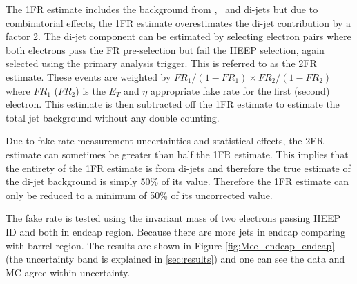 The 1FR estimate includes the background from \wjets, \phoJets\ and di-jets but due to combinatorial effects, the 1FR estimate overestimates the di-jet contribution by a factor 2. The di-jet component can be estimated by selecting electron pairs where both electrons pass the FR pre-selection but fail the HEEP selection, again selected using the primary analysis trigger. This is referred to as the 2FR estimate. These events are weighted by $FR_{1}/(1-FR_{1}) \times FR_{2}/(1-FR_{2})$ where $FR_{1}$ ($FR_{2}$) is the $E_T$ and $\eta$ appropriate fake rate for the first (second) electron. This estimate is then subtracted off the 1FR estimate to estimate the total jet background without any double counting.

Due to fake rate measurement uncertainties and statistical effects, the 2FR estimate can sometimes be greater than half the 1FR estimate. This implies that the entirety of the 1FR estimate is from di-jets and therefore the true estimate of the di-jet background is simply 50\% of its value. Therefore the 1FR estimate can only be reduced to a minimum of 50\% of its uncorrected value.

The fake rate is tested using the invariant mass of two electrons passing HEEP ID and both in endcap region. Because there are more jets in endcap comparing with barrel region. The results are shown in Figure \ref{fig:Mee_endcap_endcap} (the uncertainty band is explained in \ref{sec:results}) and one can see the data and MC agree within uncertainty.

